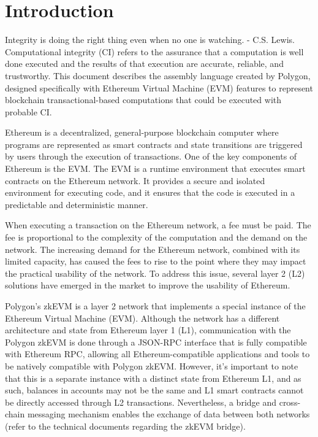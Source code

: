\section{Introduction}

Integrity is doing the right thing even when no one is watching. - C.S. Lewis. Computational integrity (CI) refers to the assurance that a computation is well done executed and the results of that execution are accurate, reliable, and trustworthy. This document describes the assembly language created by Polygon, designed specifically with Ethereum Virtual Machine (EVM) features to represent blockchain transactional-based computations that could be executed with probable CI.


Ethereum is a decentralized, general-purpose blockchain computer where programs are represented as smart contracts and state transitions are triggered by users through the execution of transactions. One of the key components of Ethereum is the EVM. The EVM is a runtime environment that executes smart contracts on the Ethereum network. It provides a secure and isolated environment for executing code, and it ensures that the code is executed in a predictable and deterministic manner. 

When executing a transaction on the Ethereum network, a fee must be paid. The fee is proportional to the complexity of the computation and the demand on the network. The increasing demand for the Ethereum network, combined with its limited capacity, has caused the fees to rise to the point where they may impact the practical usability of the network. To address this issue, several layer 2 (L2) solutions have emerged in the market to improve the usability of Ethereum.

Polygon's zkEVM is a layer 2 network that implements a special instance of the Ethereum Virtual Machine (EVM). Although the network has a different architecture and state from Ethereum layer 1 (L1), communication with the Polygon zkEVM is done through a JSON-RPC interface that is fully compatible with Ethereum RPC, allowing all Ethereum-compatible applications and tools to be natively compatible with Polygon zkEVM. However, it's important to note that this is a separate instance with a distinct state from Ethereum L1, and as such, balances in accounts may not be the same and L1 smart contracts cannot be directly accessed through L2 transactions. Nevertheless, a bridge and cross-chain messaging mechanism enables the exchange of data between both networks (refer to the technical documents regarding the zkEVM bridge).

